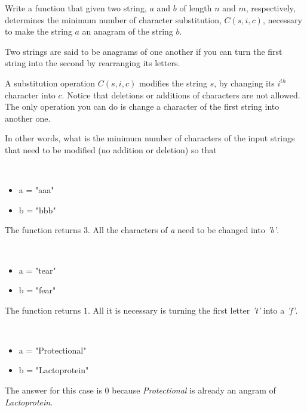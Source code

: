 	\begin{exercise}
		Write a function that given two string, $a$ and $b$ of length $n$ and $m$, respectively, determines the minimum number of character substitution, $C(s, i, c)$, necessary to make the string $a$ an anagram of the string $b$.

		Two strings are said to be anagrams of one another if you can turn the first string into the second by rearranging its letters. 
		
		A substitution operation $C(s,i,c)$ modifies the string $s$, by changing its $i^{th}$ character into $c$. Notice that deletions or additions of characters are not allowed.
		The only operation you can do is change a character of the first string into another one. 
		
		In other words, what is the minimum number of characters of the input strings that need to be modified (no addition or deletion)  so that
		
	\begin{example}
		\label{ex:two_string_anagram:example1}
		\hfill \\
		\begin{itemize}
			\item 	a = "aaa"
			\item 	b = "bbb"
		\end{itemize}
		The function returns $3$. 
		All the characters of \textit{a} need to be changed into \textit{'b'}.
		\label{ex:anagrams:example1}
	\end{example}

	\begin{example}
		\hfill \\
		\begin{itemize}
			\item 	a = "tear"
			\item	b = "fear"
		\end{itemize}
		The function returns $1$. 
		All it is necessary is turning the first letter \textit{'t'} into a \textit{'f'}.
	\end{example}

	\begin{example}
		\hfill \\
		\begin{itemize}
			\item[] 	a = "Protectional"
			\item[] 	b = "Lactoprotein"
		\end{itemize}
		The answer for this case is $0$ because \emph{Protectional} is already an angram of \emph{Lactoprotein}.
	\end{example}
\end{exercise}

